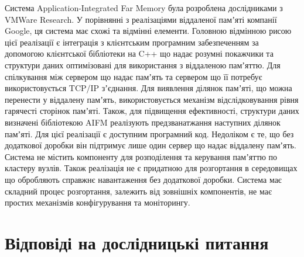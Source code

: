 Система Application-Integrated Far Memory була розроблена дослідниками з VMWare Research. У порівнянні з реалізаціями віддаленої памʼяті компанії Google, ця система має схожі та відмінні елементи.
	Головною відмінною рисою цієї реалізації є інтеграція з клієнтським програмним забезпеченням за допомогою клієнтської бібліотеки на C++ що надає розумні покажчики та структури даних оптимізовані для використання з віддаленою памʼяттю.
	Для спілкування між сервером що надає памʼять та сервером що її потребує використовується TCP/IP зʼєднання.
	Для виявлення ділянок памʼяті, що можна перенести у віддалену памʼять, використовується механізм відслідковування рівня гарячесті сторінок памʼяті. Також, для підвищення ефективності, структури даних визначені бібліотекою AIFM реалізують предзванатжання наступних ділянок памʼяті.
	Для цієї реалізації є доступним програмний код. Недоліком є те, що без додаткової доробки він підтримує лише один сервер що надає віддалену памʼять. Система не містить компоненту для розподілення та керування памʼяттю по кластеру вузлів. Також реалізація не є придатною для розгортання в середовищах що обробляють справжнє навантаження без додаткової доробки. Система має складний процес розгортання, залежить від зовнішніх компонентів, не має простих механізмів конфігурування та моніторингу.

\section{Відповіді на дослідницькі питання}

